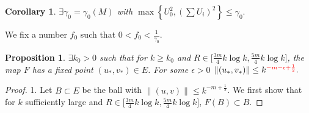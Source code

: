 \documentclass[a4paper,11pt]{article}
\def\red{\color{red}}
\def\red{\color{red}}
\newtheorem{proposition}{Proposition}[section]
\newtheorem{corollary}{Corollary}[section]
\theoremstyle{remark}
\begin{document}
\begin{corollary} 
 $\exists \gamma_0 = \gamma_0(M)$ with $\displaystyle \max\left\{U_0^2 , \left(\sum U_i\right)^2\right\} \le \gamma_0.$
\end{corollary}
We fix a number $f_0$ such that $0< f_0 < \frac{1}{\gamma_0}$.
\begin{proposition} \label{Fixed} $\exists k_0>0$ such that for $k\ge k_0$ and $R \in \Big[\frac{3m}{4}k\log k, \frac{5m}{4}k\log k\Big]$, the map $F$ has a fixed point $(u_*,v_*) \in E$. For some $\epsilon>0$ $\|(u_*,v_*)\| \le k^{\red -m -\epsilon+ \frac{1}{2}}.$
 \end{proposition}
\begin{proof}
1. Let $B \subset E$ be the ball with $\|(u,v)\| \le k^{-m + \frac{1}{2}}$. We first show that for $k$ sufficiently large and $R \in \Big[\frac{3m}{4}k\log k, \frac{5m}{4}k\log k\Big]$, $F(B) \subset B$.


\end{proof}
\end{document}
